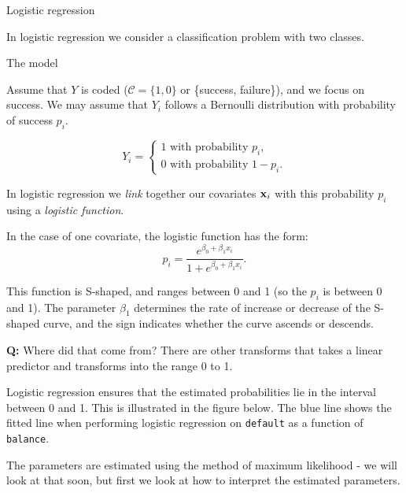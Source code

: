 \documentclass[10pt,ignorenonframetext,]{beamer}
\begin{document}
\begin{frame}{Logistic regression}

In logistic regression we consider a classification problem with two
classes.

\begin{block}{The model}

Assume that \(Y\) is coded (\(\mathcal{C} = \{1, 0\}\) or \{success,
failure\}), and we focus on success. We may assume that \(Y_i\) follows
a Bernoulli distribution with probability of success \(p_i\).

\[Y_i = \begin{cases} 1 \text{ with probability } p_i, \\ 0 \text{ with probability } 1-p_i. \end{cases}\]

In logistic regression we \emph{link} together our covariates
\({\bf x}_i\) with this probability \(p_i\) using a \emph{logistic
function}.

\end{block}

\end{frame}

\begin{frame}

In the case of one covariate, the logistic function has the form:
\[ p_i= \frac{e^{\beta_0+\beta_1 x_i}}{1 + e^{\beta_0 + \beta_1 x_i}}.\]

This function is S-shaped, and ranges between 0 and 1 (so the \(p_i\) is
between 0 and 1). The parameter \(\beta_1\) determines the rate of
increase or decrease of the S-shaped curve, and the sign indicates
whether the curve ascends or descends.

\textbf{Q:} Where did that come from? There are other transforms that
takes a linear predictor and transforms into the range 0 to 1.

\end{frame}

\begin{frame}[fragile]

Logistic regression ensures that the estimated probabilities lie in the
interval between 0 and 1. This is illustrated in the figure below. The
blue line shows the fitted line when performing logistic regression on
\texttt{default} as a function of \texttt{balance}.

The parameters are estimated using the method of maximum likelihood - we
will look at that soon, but first we look at how to interpret the
estimated parameters.

\end{frame}
\end{document}
